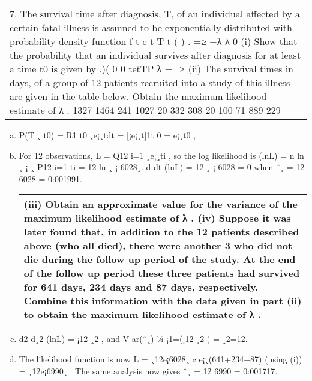 \documentclass[a4paper,12pt]{article}
\begin{document}
\begin{table}[ht!]
 \centering
 \begin{tabular}{|p{15cm}|}
 \hline  
7. The survival time after diagnosis, T, of an individual affected by a certain fatal illness is assumed to be exponentially distributed with probability density function
f t e t T t ( ) . =≥ −λ λ 0 (i) Show that the probability that an individual survives after diagnosis for at least a time t0 is given by
.)( 0 0 tetTP λ −=≥
(ii) The survival times in days, of a group of 12 patients recruited into a study of this illness are given in the table below. Obtain the maximum likelihood estimate of λ .
1327 1464 241 1027 20 332 308 20 100 71 889 229
\hline
  \end{tabular}
\end{table}


\begin{enumerate}[(a)]
\item P(T ¸ t0) =
R1
t0
¸e¡¸tdt = [¡e¡¸t]1t
0 = e¡¸t0 ,
\item For 12 observations, L =
Q12
i=1
¸e¡¸ti , so the log likelihood is (lnL) = n ln ¸ ¡ ¸
P12
i=1
ti =
12 ln ¸ ¡ 6028¸.
d
dt (lnL) = 12
¸ ¡ 6028 = 0 when ˆ¸ = 12
6028 = 0:001991.
\newpage
\begin{table}[ht!]
 \centering
 \begin{tabular}{|p{15cm}|}
 \hline  
(iii) Obtain an approximate value for the variance of  the maximum likelihood estimate of λ .
(iv) Suppose it was later found that, in addition to the 12 patients described above (who all died), there were another 3 who did not die during the follow up period of the study. At the end of the follow up period these three patients had survived for 641 days, 234 days and 87 days, respectively. Combine  this information  with the data given in part (ii) to obtain the maximum likelihood estimate of λ .\\ \hline
  \end{tabular}
\end{table}
\item  d2
d¸2 (lnL) = ¡12
¸2 , and V ar(ˆ¸) ¼ ¡1=(¡12
¸2 ) = ¸2=12.
\item The likelihood function is now
L = ¸12e¡6028¸ ¢ e¡¸(641+234+87) (using (i))
= ¸12e¡6990¸
.
The same analysis now gives ˆ¸ = 12
6990 = 0:001717.
\end{enumerate}
\end{document}
